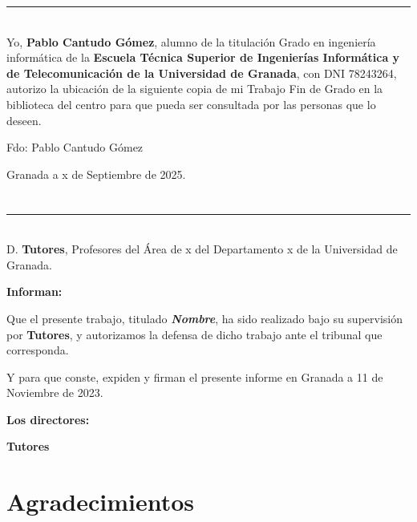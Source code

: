\noindent\rule[-1ex]{\textwidth}{2pt}\\[4.5ex]

Yo, \textbf{Pablo Cantudo Gómez}, alumno de la titulación Grado en ingeniería informática de la \textbf{Escuela Técnica Superior
de Ingenierías Informática y de Telecomunicación de la Universidad de Granada}, con DNI 78243264, autorizo la
ubicación de la siguiente copia de mi Trabajo Fin de Grado en la biblioteca del centro para que pueda ser
consultada por las personas que lo deseen.

\vspace{6cm}

\noindent Fdo: Pablo Cantudo Gómez

\vspace{2cm}

\begin{flushright}
Granada a x de Septiembre de 2025.
\end{flushright}


\chapter*{}
\thispagestyle{empty}

\noindent\rule[-1ex]{\textwidth}{2pt}\\[4.5ex]

D. \textbf{Tutores}, Profesores del Área de x del Departamento x de la Universidad de Granada.

\vspace{0.5cm}

\textbf{Informan:}

\vspace{0.5cm}

Que el presente trabajo, titulado \textit{\textbf{Nombre}},
ha sido realizado bajo su supervisión por \textbf{Tutores}, y autorizamos la defensa de dicho trabajo ante el tribunal
que corresponda.

\vspace{0.5cm}

Y para que conste, expiden y firman el presente informe en Granada a 11 de Noviembre de 2023.

\vspace{1cm}

\textbf{Los directores:}

\vspace{5cm}

\noindent \textbf{Tutores}

\chapter*{Agradecimientos}
\thispagestyle{empty}

